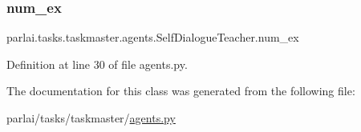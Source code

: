 \subsubsection{\texorpdfstring{num\+\_\+ex}{num\_ex}}
{\footnotesize\ttfamily parlai.\+tasks.\+taskmaster.\+agents.\+Self\+Dialogue\+Teacher.\+num\+\_\+ex}



Definition at line 30 of file agents.\+py.



The documentation for this class was generated from the following file\+:\begin{DoxyCompactItemize}
\item 
parlai/tasks/taskmaster/\hyperlink{parlai_2tasks_2taskmaster_2agents_8py}{agents.\+py}\end{DoxyCompactItemize}
